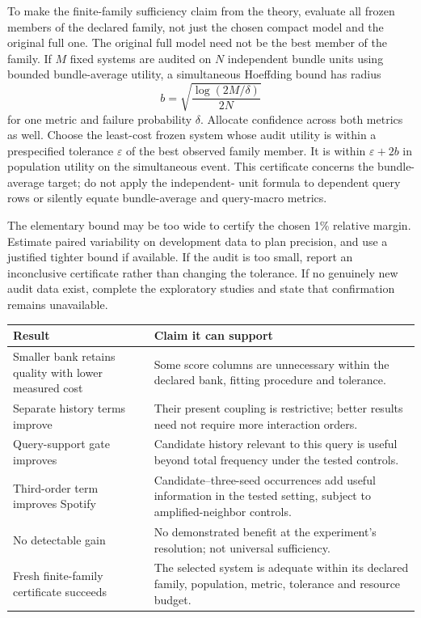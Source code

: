 \documentclass[11pt,a4paper]{article}
\begin{document}
To make the finite-family sufficiency claim from the theory, evaluate all
frozen members of the declared family, not just the chosen compact model
and the original full one. The original full model need not be the best
member of the family. If $M$ fixed systems are audited on $N$ independent
bundle units using bounded bundle-average utility, a simultaneous
Hoeffding bound has radius
\begin{equation}
 b=\sqrt{\frac{\log(2M/\delta)}{2N}}
\end{equation}
for one metric and failure probability $\delta$. Allocate confidence across
both metrics as well. Choose the least-cost frozen system whose audit utility
is within a prespecified tolerance $\varepsilon$ of the best observed family
member. It is within
$\varepsilon+2b$ in population utility on the simultaneous event. This
certificate concerns the bundle-average target; do not apply the independent-
unit formula to dependent query rows or silently equate bundle-average and
query-macro metrics.

The elementary bound may be too wide to certify the chosen 1\% relative
margin. Estimate paired variability on development data to plan precision,
and use a justified tighter bound if available. If the audit is too small,
report an inconclusive certificate rather than changing the tolerance.
If no genuinely new audit data exist, complete the exploratory studies and
state that confirmation remains unavailable.

\begin{center}
\small
\begin{tabularx}{\linewidth}{@{}YY@{}}
\toprule
Result & Claim it can support\\
\midrule
Smaller bank retains quality with lower measured cost & Some score columns are unnecessary within the declared bank, fitting procedure and tolerance.\\
Separate history terms improve & Their present coupling is restrictive; better results need not require more interaction orders.\\
Query-support gate improves & Candidate history relevant to this query is useful beyond total frequency under the tested controls.\\
Third-order term improves Spotify & Candidate--three-seed occurrences add useful information in the tested setting, subject to amplified-neighbor controls.\\
No detectable gain & No demonstrated benefit at the experiment's resolution; not universal sufficiency.\\
Fresh finite-family certificate succeeds & The selected system is adequate within its declared family, population, metric, tolerance and resource budget.\\
\bottomrule
\end{tabularx}
\end{center}
\end{document}
